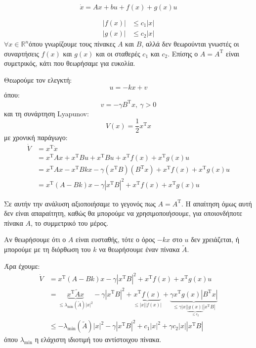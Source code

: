 \documentclass[11pt,a4paper,notitlepage,fleqn]{article}
\let\mytodo\todo
\renewcommand{\todo}[1]{\par\mytodo[inline,noline]{#1}}
\begin{document}
\[
\dot x = Ax + bu + f(x) + g(x) u
\]

\begin{align*}
	\left| f(x) \right| &\leq c_1|x| \\
	\left| g(x) \right| &\leq c_2|x|
\end{align*}
\( \forall x \in \mathbb R^n \)όπου γνωρίζουμε τους πίνακες \( A \) και \( B \), αλλά δεν
θεωρούνται γνωστές οι συναρτήσεις \( f(x) \) και \( g(x) \) και
οι σταθερές \( c_1 \) και \( c_2 \). Επίσης ο \( A = A^{\mathrm T} \) είναι
συμετρικός, κάτι που θεωρήσαμε για ευκολία.

Θεωρούμε τον ελεγκτή:
\[
u = -kx + v
\]
όπου:
\[
v = -γB^{\mathrm T}x,\ γ > 0
\]
και τη συνάρτηση Lyapunov:
\[
V(x) = \frac{1}{2} x^{\mathrm T} x
\]
με χρονική παράγωγο:
\begin{align*}
	\dot V &= x^{\mathrm T} \dot x
	\\ &= x^{\mathrm T} A x + x^{\mathrm T} B u + x^{\mathrm T}B u
	+ x^{\mathrm T} f(x) + x^{\mathrm T} g(x)u
	\\ &= x^{\mathrm T} A x - x^{\mathrm T} B k x - \gamma(x^{\mathrm T}B)(B^{\mathrm T} x) + x^{\mathrm T}f(x) + x^{\mathrm T}g(x)u
	\\ &= x^{\mathrm T}(A-Bk)x - \gamma\left| x^{\mathrm T}B \right|^2
	+ x^{\mathrm T}f(x) + x^{\mathrm T}g(x)u
\end{align*}

Σε αυτήν την ανάλυση αξιοποιήσαμε το γεγονός πως \( A=A^{\mathrm T} \).
Η απαίτηση όμως αυτή δεν είναι απαραίτητη, καθώς θα μπορούμε να χρησιμοποιήσουμε, για οποιονδήποτε πίνακα \( A \), το συμμετρικό του μέρος.

Αν θεωρήσουμε ότι ο \( A \) είναι ευσταθής, τότε ο όρος \( -kx \) στο \( u \) δεν χρειάζεται, ή μπορούμε με τη διόρθωση του \( k \) να θεωρήσουμε έναν πίνακα \( \tilde A \). \todo{what?}

Άρα έχουμε:
\begin{align*}
	\dot V &= x^{\mathrm T}(A-Bk)x
	- \gamma\left| x^{\mathrm T}B \right|^2
	+ x^{\mathrm T}f(x) 
	+ x^{\mathrm T}g(x)u
	\\
    &=	\underbrace{x^{\mathrm T} \tilde A x}_{\leq \lambda_{\min} (\tilde A)|x|^2}
	- \gamma\left| x^{\mathrm T}B \right|^2
	+ \underbrace{x^{\mathrm T}f(x) }_{\leq |x|\left|f(x)\right|}
	+ \underbrace{\gamma x^{\mathrm T} g(x) \left| B^{\mathrm T} x \right|}_{\leq \gamma|x|\underbrace{\left| g(x) \right|}_{\leq c_2} \left| x^{\mathrm T} B \right|}
	\\ &\leq -\lambda_{\min}(\tilde A) |x|^2 - \gamma\left|x^{\mathrm T} B\right|^2  + c_1 |x|^2 + \gamma c_2|x|\left| x^{\mathrm{T}}B \right|
\end{align*}
όπου \( \lambda_{\min} \) η ελάχιστη ιδιοτιμή του αντίστοιχου πίνακα.
\end{document}
